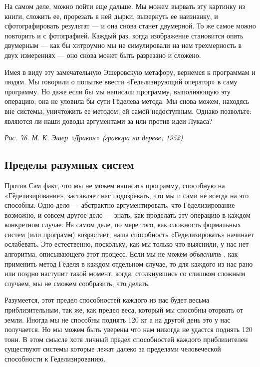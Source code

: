 \documentclass[../main.tex]{subfiles}
\begin{document}
На самом деле, можно пойти еще дальше. Мы можем вырвать эту картинку из книги, сложить ее, прорезать в ней дырки, вывернуть ее наизнанку, и сфотографировать результат --- и она снова станет двумерной. То же самое можно повторить и с фотографией. Каждый раз, когда изображение становится опять двумерным --- как бы хитроумно мы не симулировали на нем трехмерность в двух измерениях --- оно снова может быть разрезано и сложено.

Имея в виду эту замечательную Эшеровскую метафору, вернемся к программам и людям. Мы говорили о попытке ввести «Геделизирующий оператор» в саму программу. Но даже если бы мы написали программу, выполняющую эту операцию, она не уловила бы сути Гёделева метода. Мы снова можем, находясь вне системы, уничтожить ее методом, ей самой недоступным. Однако позвольте: являются ли наши доводы аргументами за или против идеи Лукаса?

\emph{Рис. 76. М. К. Эшер «Дракон» (гравюра на дереве, 1952)}


\subsection{Пределы разумных систем}

Против Сам факт, что мы не можем написать программу, способную на «Гёделизирование», заставляет нас подозревать, что мы и сами не всегда на это способны. Одно дело --- абстрактно аргументировать, что Гёделизирование возможно, и совсем другое дело --- знать, как проделать эту операцию в каждом конкретном случае. На самом деле, по мере того, как сложность формальных систем (или программ) возрастает, наша способность «Геделизировать» начинает ослабевать. Это естественно, поскольку, как мы только что выяснили, у нас нет алгоритма, описывающего этот процесс. Если мы не можем \emph{объяснить} , как применить метод Гёделя в каждом отдельном случае, то для каждого из нас рано или поздно наступит такой момент, когда, столкнувшись со слишком сложным случаем, мы не сможем сообразить, что делать.

Разумеется, этот предел способностей каждого из нас будет весьма приблизительным, так же, как предел веса, который мы способны оторвать от земли. Иногда мы не способны поднять 120 кг а на другой день это у нас получается. Но мы можем быть уверены что нам никогда не удастся поднять 120 тонн. В этом смысле хотя личный предел способностей каждого приблизителен существуют системы которые лежат далеко за пределами человеческой способности к Геделизированию.
\end{document}
